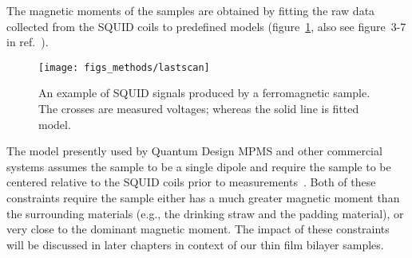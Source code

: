 The magnetic moments of the samples are obtained by fitting the raw data collected from the SQUID coils to predefined models (figure~\ref{fig:lastscan}, also see figure~3-7 in ref.~\cite{mpms_software}). %
\begin{figure}[ht]%
	\centering%
    \texttt{[image: figs\_methods/lastscan]}%
    \caption[An example of SQUID signals.]{\label{fig:lastscan}An example of SQUID signals produced by a ferromagnetic sample. The crosses are measured voltages; whereas the solid line is fitted model.}%
\end{figure}%
The model presently used by Quantum Design MPMS and other commercial systems assumes the sample to be a single dipole and require the sample to be centered relative to the SQUID coils prior to measurements~\cite{mpms_software, squid_bg, squid_center_error}. Both of these constraints require the sample either has a much greater magnetic moment than the surrounding materials (e.g., the drinking straw and the padding material), or very close to the dominant magnetic moment. The impact of these constraints will be discussed in later chapters in context of our thin film bilayer samples.